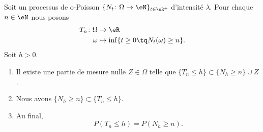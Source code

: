 \begin{lemma}        \label{LEMooXTVNooSBnnAd}
	Soit un processus de o-Poisson \(  \{ N_t\colon \Omega\to \eN \}_{t\in \eR^+}  \) d'intensité \( \lambda\). Pour chaque \( n\in \eN\) nous posons
	\begin{equation}
		\begin{aligned}
			T_n\colon \Omega & \to \eR                                         \\
			\omega           & \mapsto \inf\{ t\geq 0\tq N_t(\omega)\geq n \}.
		\end{aligned}
	\end{equation}
	Soit \( h>0\).
	\begin{enumerate}
		\item   \label{ITEMooXVSQooSQmIUv}
		      Il existe une partie de mesure nulle \( Z\in \Omega\) telle que \( \{ T_n\leq h \}\subset \{ N_h\geq n \}\cup Z\).
		\item       \label{ITEMooIPKCooIfjUzS}
		      Nous avons \( \{ N_h\geq n \}\subset \{ T_n\leq h \}\).
		\item
		      Au final,
		      \begin{equation}
			      P(T_n\leq h)=P(N_h\geq n).
		      \end{equation}
	\end{enumerate}
\end{lemma}


